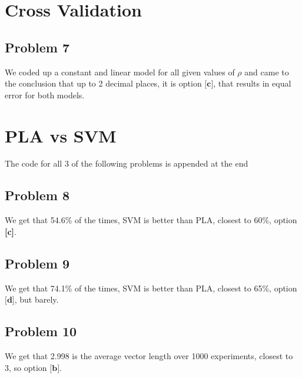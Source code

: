 \documentclass{article}
\begin{document}
\section*{Cross Validation}
\subsection*{Problem 7}
We coded up a constant and linear model for all given values of $\rho$ and came to the conclusion that up to 2 decimal places, it is option $\textbf{[c]}$, that results in equal error for both models. 
\section*{PLA vs SVM}
The code for all 3 of the following problems is appended at the end
\subsection*{Problem 8}
We get that 54.6\% of the times, SVM is better than PLA, closest to 60\%, option \textbf{[c]}. 
\subsection*{Problem 9}
We get that 74.1\% of the times, SVM is better than PLA, closest to 65\%, option $\textbf{[d]}$, but barely.
\subsection*{Problem 10}
We get that 2.998 is the average vector length over 1000 experiments, closest to 3, so option $\textbf{[b]}$.


\end{document}
